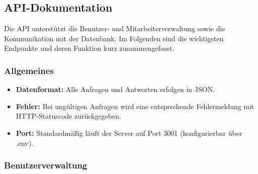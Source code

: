 \subsection{API-Dokumentation}
\label{subsec:api-dokumentation}

Die API unterstützt die Benutzer- und Mitarbeiterverwaltung sowie die Kommunikation mit der Datenbank. Im Folgenden sind die wichtigsten Endpunkte und deren Funktion kurz zusammengefasst.


\subsubsection{Allgemeines}

\begin{itemize}
    \item \textbf{Datenformat: }Alle Anfragen und Antworten erfolgen in JSON.
    \item \textbf{Fehler: }Bei ungültigen Anfragen wird eine entsprechende Fehlermeldung mit HTTP-Statuscode zurückgegeben.
    \item \textbf{Port: }Standardmäßig läuft der Server auf Port 3001 (konfigurierbar über .env).
\end{itemize}


\subsubsection{Benutzerverwaltung}

